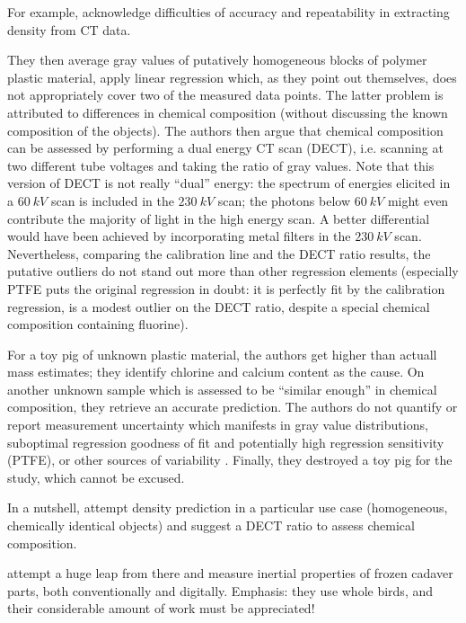 For example, \citet{DuPlessis2013} acknowledge difficulties of accuracy and repeatability in extracting density from CT data.

They then average gray values of putatively homogeneous blocks of polymer plastic material, apply linear regression which, as they point out themselves, does not appropriately cover two of the measured data points.
The latter problem is attributed to differences in chemical composition (without discussing the known composition of the objects).
The authors then argue that chemical composition can be assessed by performing a dual energy CT scan (DECT), i.e. scanning at two different tube voltages and taking the ratio of gray values.
Note that this version of DECT is not really ``dual'' energy: the spectrum of energies elicited in a \(60\ kV\) scan is included in the \(230\ kV\) scan; the photons below \(60\ kV\) might even contribute the majority of light in the high energy scan.
A better differential would have been achieved by incorporating metal filters in the \(230\ kV\) scan.
Nevertheless, comparing the calibration line and the DECT ratio results, the putative outliers do not stand out more than other regression elements (especially PTFE puts the original regression in doubt: it is perfectly fit by the calibration regression, is a modest outlier on the DECT ratio, despite a special chemical composition containing fluorine).

For a toy pig of unknown plastic material, the authors get higher than actuall mass estimates; they identify chlorine and calcium content as the cause.
On another unknown sample which is assessed to be ``similar enough'' in chemical composition, they retrieve an accurate prediction.
The authors do not quantify or report measurement uncertainty which manifests in gray value distributions, suboptimal regression goodness of fit and potentially high regression sensitivity (PTFE), or other sources of variability \citep{Macaulay2017}.
Finally, they destroyed a toy pig for the study, which cannot be excused.

In a nutshell, \citet{DuPlessis2013} attempt density prediction in a particular use case (homogeneous, chemically identical objects) and suggest a DECT ratio to assess chemical composition.


\citet{Durston2022} attempt a huge leap from there and measure inertial properties of frozen cadaver parts, both conventionally and digitally.
Emphasis: they use whole birds, and their considerable amount of work must be appreciated!

